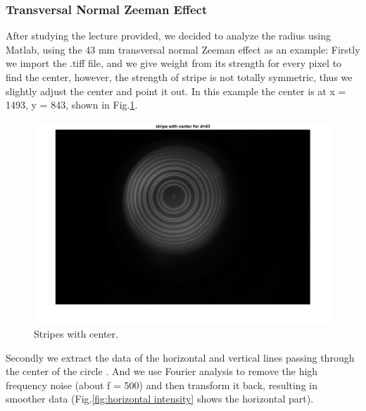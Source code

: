 \documentclass[a4paper,12pt]{article}
\begin{document}
    \subsubsection{Transversal Normal Zeeman Effect}\label{4.2.2}
    
    \par After studying the lecture provided, we decided to analyze the radius using Matlab, using the 43 mm transversal normal Zeeman effect as an example: Firstly we import the .tiff file, and we give weight from its strength for every pixel to find the center, however, the strength of stripe is not totally symmetric, thus we slightly adjust the center and point it out. In this example the center is at x = 1493, y = 843, shown in Fig.\ref{fig:stripe with center}.
    
    \begin{figure}[H]
        \centering
            \includegraphics[width=\textwidth]{stripe_with_center_43.png}
            \caption{Stripes with center.}
            \label{fig:stripe with center}
    \end{figure}
    
    \par Secondly we extract the data of the horizontal and vertical lines passing through the center of the circle . And we use Fourier analysis to remove the high frequency noise (about f = 500) and then transform it back, resulting in smoother data (Fig.\ref{fig:horizontal intensity} shows the horizontal part).
    
\end{document}
